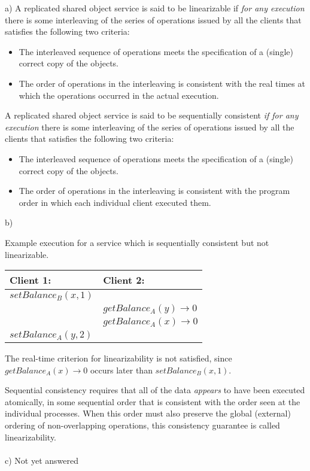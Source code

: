 \documentclass[a4paper]{article}
\newcommand{\solution}[2][]{
  \ifthenelse{\equal{#1}{} \or \equal{#1}{a}}{\\[3pt]\textit{Solution: }\\[0.1cm]}{}
  \parbox[t]{\textwidth}{
    \ifthenelse{\equal{#1}{}}{}{#1)}
    \parbox[t]{0.95\textwidth}{#2}}\\
}
\newcommand{\highlight}[1]{{\color{blue}#1}}
\begin{document}
\solution{
  a) A replicated shared object service is said to be
  \highlight{linearizable} if \textit{for any execution} there is
  some interleaving of the series of operations issued by all the
  clients that satisfies the following two criteria:
  \begin{itemize}
    \item The interleaved sequence of operations meets the
      specification of a (single) correct copy of the objects.
    \item The order of operations in the interleaving is consistent
      with the \highlight{real times at which the operations
        occurred in the actual execution.}
  \end{itemize}

  A replicated shared object service is said to be
  \highlight{sequentially consistent} \textit{if for any
    execution} there is some interleaving of the series of operations
  issued by all the clients that satisfies the following two criteria:
  \begin{itemize}
    \item The interleaved sequence of operations meets the
      specification of a (single) correct copy of the objects.
    \item The order of operations in the interleaving is consistent
      with the \highlight{program order in which each individual
        client executed them.}
  \end{itemize}

  b) \begin{center}
    Example execution for a service which is sequentially consistent
    but not linearizable.

    \begin{tabular}{| l | l |}\hline
      Client 1: & Client 2: \\\hline
      $setBalance_B(x, 1)$ &\\
      & $getBalance_A(y) \rightarrow 0$\\
      & $getBalance_A(x) \rightarrow 0$\\
      $setBalance_A(y, 2)$ &\\\hline
    \end{tabular}
    The real-time criterion for linearizability is not satisfied,
    since $getBalance_A(x) \rightarrow 0$ occurs later than
    $setBalance_B(x,1)$.\\
  \end{center}

  Sequential consistency requires that all of the data
  \textit{appears} to have been executed atomically, in some sequential
  order that is consistent with the order seen at the individual
  processes. When this order must also preserve the global (external)
  ordering of non-overlapping operations, this consistency guarantee is
  called linearizability.\\ \\
  c) Not yet answered
}
\end{document}
